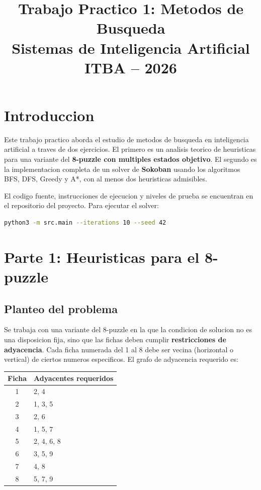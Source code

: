 \documentclass[12pt, a4paper]{article}
\title{
  \textbf{Trabajo Practico 1: Metodos de Busqueda} \\[0.3cm]
  \large Sistemas de Inteligencia Artificial \\[0.2cm]
  \normalsize ITBA -- 2026
}
\author{}
\date{}
\begin{document}
\maketitle
\thispagestyle{empty}
\newpage
\tableofcontents
\newpage

\section{Introduccion}

Este trabajo practico aborda el estudio de metodos de busqueda en inteligencia artificial a traves de dos ejercicios. El primero es un analisis teorico de heuristicas para una variante del \textbf{8-puzzle con multiples estados objetivo}. El segundo es la implementacion completa de un solver de \textbf{Sokoban} usando los algoritmos BFS, DFS, Greedy y A*, con al menos dos heuristicas admisibles.

El codigo fuente, instrucciones de ejecucion y niveles de prueba se encuentran en el repositorio del proyecto. Para ejecutar el solver:

\begin{lstlisting}[language=bash, numbers=none]
python3 -m src.main --iterations 10 --seed 42
\end{lstlisting}

\section{Parte 1: Heuristicas para el 8-puzzle}

\subsection{Planteo del problema}

Se trabaja con una variante del 8-puzzle en la que la condicion de solucion no es una disposicion fija, sino que las fichas deben cumplir \textbf{restricciones de adyacencia}. Cada ficha numerada del 1 al 8 debe ser vecina (horizontal o vertical) de ciertos numeros especificos. El grafo de adyacencia requerido es:

\begin{center}
\small
\begin{tabular}{cl}
\toprule
\textbf{Ficha} & \textbf{Adyacentes requeridos} \\
\midrule
1 & 2, 4 \\
2 & 1, 3, 5 \\
3 & 2, 6 \\
4 & 1, 5, 7 \\
5 & 2, 4, 6, 8 \\
6 & 3, 5, 9 \\
7 & 4, 8 \\
8 & 5, 7, 9 \\
\bottomrule
\end{tabular}
\end{center}
\end{document}
